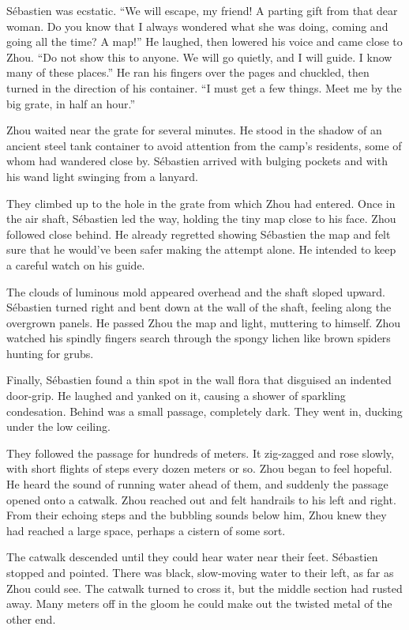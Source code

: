 \documentclass[10pt,b5paper]{article}
\begin{document}
S\'{e}bastien was ecstatic. ``We will escape, my friend! A parting
gift from that dear woman. Do you know that I always wondered what
she was doing, coming and going all the time? A map!'' He laughed,
then lowered his voice and came close to Zhou. ``Do not show this
to anyone. We will go quietly, and I will guide. I know many of
these places.'' He ran his fingers over the pages and chuckled,
then turned in the direction of his container. ``I must get a few
things. Meet me by the big grate, in half an hour.''

\bigskip

Zhou waited near the grate for several minutes. He stood in the
shadow of an ancient steel tank container to avoid attention
from the camp's residents, some of whom had wandered close by.
S\'{e}bastien arrived with bulging pockets and with his wand light
swinging from a lanyard.

They climbed up to the hole in the grate from which Zhou had
entered. Once in the air shaft, S\'{e}bastien led the way, holding the
tiny map close to his face. Zhou followed close behind. He already
regretted showing S\'{e}bastien the map and felt sure that he would've
been safer making the attempt alone. He intended to keep a careful
watch on his guide.

The clouds of luminous mold appeared overhead and the shaft sloped
upward. S\'{e}bastien turned right and bent down at the wall of the
shaft, feeling along the overgrown panels. He passed Zhou the map and
light, muttering to himself. Zhou watched his spindly fingers search
through the spongy lichen like brown spiders hunting for grubs.

Finally, S\'{e}bastien found a thin spot in the wall flora that disguised
an indented door-grip. He laughed and yanked on it, causing a shower
of sparkling condesation. Behind was a small passage, completely
dark. They went in, ducking under the low ceiling.

They followed the passage for hundreds of meters. It zig-zagged
and rose slowly, with short flights of steps every dozen meters or
so. Zhou began to feel hopeful. He heard the sound of running water
ahead of them, and suddenly the passage opened onto a catwalk. Zhou
reached out and felt handrails to his left and right. From their
echoing steps and the bubbling sounds below him, Zhou knew they
had reached a large space, perhaps a cistern of some sort.

The catwalk descended until they could hear water near their feet.
S\'{e}bastien stopped and pointed. There was black, slow-moving water to
their left, as far as Zhou could see. The catwalk turned to cross
it, but the middle section had rusted away. Many meters off in the
gloom he could make out the twisted metal of the other end.
\end{document}
